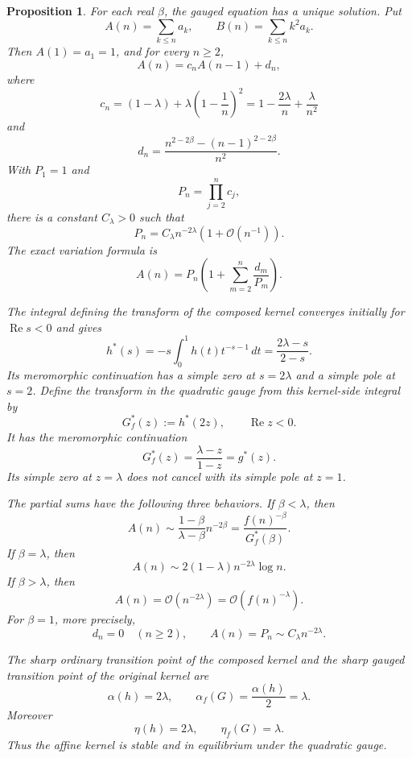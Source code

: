 \documentclass[10pt,a4paper]{amsart}
\newtheorem{proposition}{Proposition}
\renewcommand{\Re}{\operatorname{Re}}
\begin{document}
\begin{proposition}\label{thm:affine_quadratic_gauge}
For each real \(\beta\), the gauged equation has a unique solution. Put
\[
A(n)=\sum_{k\leq n}a_k,
\qquad
B(n)=\sum_{k\leq n}k^2a_k.
\]
Then \(A(1)=a_1=1\), and for every \(n\geq2\),
\[
A(n)=c_nA(n-1)+d_n,
\]
where
\[
c_n=(1-\lambda)+\lambda\left(1-\frac1n\right)^2
=1-\frac{2\lambda}{n}+\frac{\lambda}{n^2}
\]
and
\[
d_n=
\frac{n^{2-2\beta}-(n-1)^{2-2\beta}}{n^2}.
\]
With \(P_1=1\) and
\[
P_n=\prod_{j=2}^{n}c_j,
\]
there is a constant \(C_\lambda>0\) such that
\[
P_n=C_\lambda n^{-2\lambda}
\left(1+\mathcal O(n^{-1})\right).
\]
The exact variation formula is
\[
A(n)=P_n\left(
1+\sum_{m=2}^{n}\frac{d_m}{P_m}
\right).
\]

The integral defining the transform of the composed kernel converges
initially for \(\Re s<0\) and gives
\[
h^*(s)
=-s\int_0^1h(t)t^{-s-1}\,dt
=\frac{2\lambda-s}{2-s}.
\]
Its meromorphic continuation has a simple zero at \(s=2\lambda\) and a
simple pole at \(s=2\). Define the transform in the quadratic gauge from
this kernel-side integral by
\[
G^*_f(z):=h^*(2z),
\qquad \Re z<0.
\]
It has the meromorphic continuation
\[
G^*_f(z)
=\frac{\lambda-z}{1-z}
=g^*(z).
\]
Its simple zero at \(z=\lambda\) does not cancel with its simple pole at
\(z=1\).

The partial sums have the following three behaviors. If \(\beta<\lambda\),
then
\[
A(n)\sim
\frac{1-\beta}{\lambda-\beta}n^{-2\beta}
=\frac{f(n)^{-\beta}}{G^*_f(\beta)}.
\]
If \(\beta=\lambda\), then
\[
A(n)\sim
2(1-\lambda)n^{-2\lambda}\log n.
\]
If \(\beta>\lambda\), then
\[
A(n)=\mathcal O(n^{-2\lambda})
=\mathcal O\!\left(f(n)^{-\lambda}\right).
\]
For \(\beta=1\), more precisely,
\[
d_n=0
\quad(n\geq2),
\qquad
A(n)=P_n\sim C_\lambda n^{-2\lambda}.
\]

The sharp ordinary transition point of the composed kernel and the sharp
gauged transition point of the original kernel are
\[
\alpha(h)=2\lambda,
\qquad
\alpha_f(G)=\frac{\alpha(h)}2=\lambda.
\]
Moreover
\[
\eta(h)=2\lambda,
\qquad
\eta_f(G)=\lambda.
\]
Thus the affine kernel is stable and in equilibrium under the quadratic
gauge.
\end{proposition}
\end{document}
